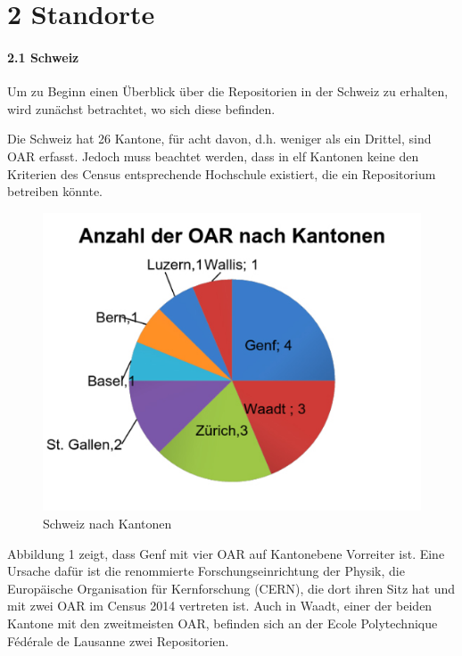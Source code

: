 \documentclass[a4paper,
fontsize=11pt,
oneside,
numbers=noperiodatend,
parskip=half-,
bibliography=totoc,
final
]{scrartcl}
\begin{document}
\section*{2 Standorte}\label{standorte}

\paragraph{2.1 Schweiz}\label{schweiz}

Um zu Beginn einen Überblick über die Repositorien in der Schweiz zu
erhalten, wird zunächst betrachtet, wo sich diese befinden.

Die Schweiz hat 26 Kantone, für acht davon, d.h. weniger als ein
Drittel, sind OAR erfasst. Jedoch muss beachtet werden, dass in elf
Kantonen keine den Kriterien des Census entsprechende Hochschule
existiert, die ein Repositorium betreiben könnte.

\begin{figure}[htbp]
\centering
\includegraphics{img/abb1_anzahl_oar_kantone.jpg}
\caption{Schweiz nach Kantonen}
\end{figure}

Abbildung 1 zeigt, dass Genf mit vier OAR auf Kantonebene Vorreiter ist.
Eine Ursache dafür ist die renommierte Forschungseinrichtung der Physik,
die Europäische Organisation für Kernforschung (CERN), die dort ihren
Sitz hat und mit zwei OAR im Census 2014 vertreten ist. Auch in Waadt,
einer der beiden Kantone mit den zweitmeisten OAR, befinden sich an der
Ecole Polytechnique Fédérale de Lausanne zwei Repositorien.
\end{document}
